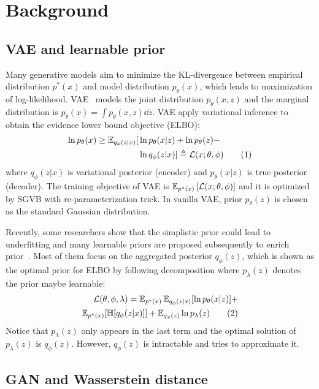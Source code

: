 \section{Background}

\subsection{VAE and learnable prior}

Many generative models aim to minimize the KL-divergence between empirical distribution $p^*(x)$ and model distribution $p_\theta(x)$, which leads to maximization of log-likelihood. VAE~\cite{kingma2014auto} models the joint distribution $p_\theta(x, z)$ and the marginal distribution is $p_\theta(x) = \int p_\theta(x, z) \dd z$. VAE apply variational inference to obtain the evidence lower bound objective (ELBO): 
\begin{align*} \label{eq:ELBO}
\ln p_\theta(x) \geq \operatorname{\mathbb{E}}_{q_\phi(z|x)} [  &  \ln p_\theta(x|z) + \ln p_\theta(z) - \\ & \ln q_\phi(z|x) ] 
\triangleq \mathcal{L}(x; \theta, \phi) \tag{1}
\end{align*}
where $q_\phi(z|x)$ is variational posterior (encoder) and $p_\theta(x|z)$ is true posterior (decoder). The training objective of VAE is $\operatorname{\mathbb{E}}_{{p^*(x)}}\left[{\mathcal{L}(x; \theta, \phi)}\right]$ and it is optimized by SGVB with re-parameterization trick. In vanilla VAE, prior $p_\theta(z)$ is chosen as the standard Gaussian distribution. 

Recently, some researchers show that the simplistic prior could lead to underfitting and many learnable priors are proposed subsequently to enrich prior~\cite{tomczak2018vae}. Most of them focus on the aggregated posterior $q_\phi(z)$, which is shown as the optimal prior for ELBO by following decomposition where $p_\lambda(z)$ denotes the prior maybe learnable:
\begin{align*} \label{eq:second-decomposition}
\mathcal{L}(\theta, \phi, \lambda) = \operatorname{\mathbb{E}}_{p^*(x)}\operatorname{\mathbb{E}}_{q_\phi(z|x)} [ \ln p_\theta(x|z)] + \\ 
\operatorname{\mathbb{E}}_{p^*(x)}[\mathbb{H}[q_\phi(z|x)]] + \operatorname{\mathbb{E}}_{q_\phi(z)} \ln p_\lambda(z) \tag{2}
\end{align*}
Notice that $p_\lambda(z)$ only appears in the last term and the optimal solution of $p_\lambda(z)$ is $q_\phi(z)$. However, $q_\phi(z)$ is intractable and \cite{tomczak2018vae,takahashi2019variational} tries to approximate it. 

\subsection{GAN and Wasserstein distance}

